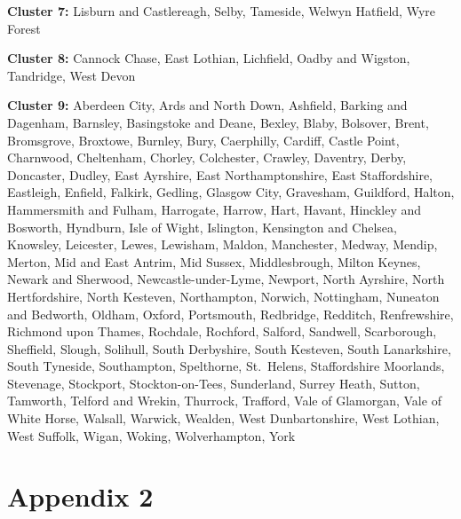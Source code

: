 \documentclass[]{interact}
\theoremstyle{plain}%
\theoremstyle{definition}
\theoremstyle{remark}
\begin{document}
\textbf{Cluster 7: } Lisburn and Castlereagh, Selby, Tameside, Welwyn
Hatfield, Wyre Forest

\textbf{Cluster 8: } Cannock Chase, East Lothian, Lichfield, Oadby and
Wigston, Tandridge, West Devon

\textbf{Cluster 9: } Aberdeen City, Ards and North Down, Ashfield,
Barking and Dagenham, Barnsley, Basingstoke and Deane, Bexley, Blaby,
Bolsover, Brent, Bromsgrove, Broxtowe, Burnley, Bury, Caerphilly,
Cardiff, Castle Point, Charnwood, Cheltenham, Chorley, Colchester,
Crawley, Daventry, Derby, Doncaster, Dudley, East Ayrshire, East
Northamptonshire, East Staffordshire, Eastleigh, Enfield, Falkirk,
Gedling, Glasgow City, Gravesham, Guildford, Halton, Hammersmith and
Fulham, Harrogate, Harrow, Hart, Havant, Hinckley and Bosworth,
Hyndburn, Isle of Wight, Islington, Kensington and Chelsea, Knowsley,
Leicester, Lewes, Lewisham, Maldon, Manchester, Medway, Mendip, Merton,
Mid and East Antrim, Mid Sussex, Middlesbrough, Milton Keynes, Newark
and Sherwood, Newcastle-under-Lyme, Newport, North Ayrshire, North
Hertfordshire, North Kesteven, Northampton, Norwich, Nottingham,
Nuneaton and Bedworth, Oldham, Oxford, Portsmouth, Redbridge, Redditch,
Renfrewshire, Richmond upon Thames, Rochdale, Rochford, Salford,
Sandwell, Scarborough, Sheffield, Slough, Solihull, South Derbyshire,
South Kesteven, South Lanarkshire, South Tyneside, Southampton,
Spelthorne, St.~Helens, Staffordshire Moorlands, Stevenage, Stockport,
Stockton-on-Tees, Sunderland, Surrey Heath, Sutton, Tamworth, Telford
and Wrekin, Thurrock, Trafford, Vale of Glamorgan, Vale of White Horse,
Walsall, Warwick, Wealden, West Dunbartonshire, West Lothian, West
Suffolk, Wigan, Woking, Wolverhampton, York

\hypertarget{appendix2}{%
\section*{Appendix 2}\label{appendix2}}
\end{document}

